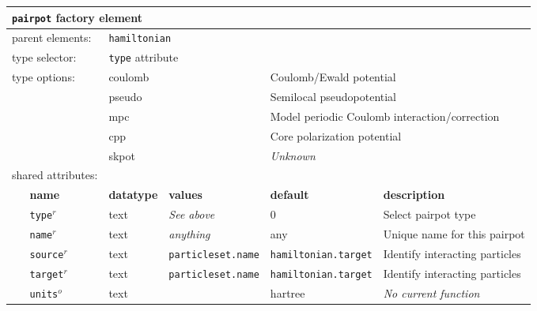 \FloatBarrier
\begin{table}[h]
\begin{center}
\begin{tabularx}{\textwidth}{l l l l l X }
\hline
\multicolumn{6}{l}{\texttt{pairpot} factory element} \\
\hline
\multicolumn{2}{l}{parent elements:} & \multicolumn{4}{l}{\texttt{hamiltonian}}\\
\multicolumn{2}{l}{type   selector:} & \multicolumn{4}{l}{\texttt{type} attribute}\\
\multicolumn{2}{l}{type   options: } & \multicolumn{2}{l}{coulomb           } & \multicolumn{2}{l}{Coulomb/Ewald potential}\\
\multicolumn{2}{l}{                } & \multicolumn{2}{l}{pseudo            } & \multicolumn{2}{l}{Semilocal pseudopotential}\\
\multicolumn{2}{l}{                } & \multicolumn{2}{l}{mpc               } & \multicolumn{2}{l}{Model periodic Coulomb interaction/correction}\\
\multicolumn{2}{l}{                } & \multicolumn{2}{l}{cpp               } & \multicolumn{2}{l}{Core polarization potential}\\
\multicolumn{2}{l}{                } & \multicolumn{2}{l}{skpot             } & \multicolumn{2}{l}{\textit{Unknown}}\\
\multicolumn{2}{l}{shared attributes:} & \multicolumn{4}{l}{}\\
   &   \bfseries name     & \bfseries datatype & \bfseries values & \bfseries default   & \bfseries description \\
   &   \texttt{type}$^r$      &  text              & \textit{See above}        & 0                   & Select pairpot type         \\
   &   \texttt{name}$^r$      &  text              & \textit{anything}         & any                 & Unique name for this pairpot\\
   &   \texttt{source}$^r$    &  text              & \texttt{particleset.name} &\texttt{hamiltonian.target}& Identify interacting particles\\
   &   \texttt{target}$^r$    &  text              & \texttt{particleset.name} &\texttt{hamiltonian.target}& Identify interacting particles  \\
   &   \texttt{units}$^o$     &  text              &                           & hartree             & \textit{No current function}  \\
\hline
\end{tabularx}
\end{center}
\end{table}
\FloatBarrier

